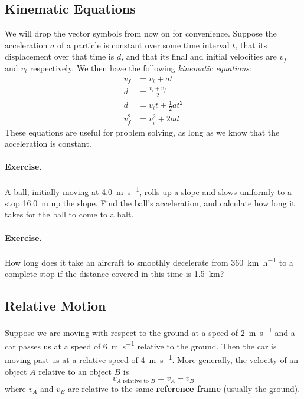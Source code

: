 \documentclass[a4paper]{amsbook}
\begin{document}
\subsection{Kinematic Equations}
We will drop the vector symbols from now on for convenience. Suppose the acceleration $ a $ of a particle is
constant over some time interval $ t $, that its displacement over that time is $ d $, and that its final and
initial velocities are $ v_f $ and $ v_i $ respectively. We then have the following \textit{kinematic equations}:
\begin{align}
  v_f &= v_i + at\\
  d &= \frac{v_i + v_f}{2}\\
  d &= v_i t + \frac{1}{2} at^2\\
  v_f^2 &= v_i^2 + 2ad
\end{align}
These equations are useful for problem solving, as long as we know that the acceleration is constant.
\paragraph{Exercise.} A ball, initially moving at \SI{4.0}{\metre\per\second}, rolls up a slope and slows uniformly
to a stop \SI{16.0}{\metre} up the slope. Find the ball's acceleration, and calculate how long it takes for the ball
to come to a halt.

\paragraph{Exercise.} How long does it take an aircraft to smoothly decelerate from \SI{360}{\kilo\metre\per\hour} to
a complete stop if the distance covered in this time is \SI{1.5}{\kilo\metre}?

\subsection{Relative Motion}
Suppose we are moving with respect to the ground at a speed of \SI{2}{\metre\per\second} and a car passes us at a
speed of \SI{6}{\metre\per\second} relative to the ground. Then the car is moving past us at a relative speed of \SI{4}{\metre\per\second}.
More generally, the velocity of an object $ A $ relative to an object $ B $ is
\begin{equation}
  v_{A \text{ relative to } B} = v_A - v_B
\end{equation}
where $ v_A $ and $ v_B $ are relative to the same \textbf{reference frame} (usually the ground).
\end{document}
